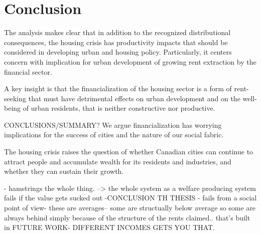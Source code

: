 
\chapter{Conclusion} \label{chapter-conclusions}
The analysis makes clear that in addition to the recognized distributional consequences, the housing crisis has productivity impacts that should be considered in developing urban and housing policy. Particularly, it centers concern with implication for urban development of growing rent extraction by the financial sector. 

A key insight is that the financialization of the housing sector is a form of \gls{rent-seeking} that must have detrimental effects on urban development and on the well-being of urban residents, that is neither constructive nor productive.

CONCLUSIONS/SUMMARY?
We argue financialization %
has worrying implications for the success of cities and the nature of our social fabric. 



The housing crisis raises the question of whether Canadian cities can continue to attract people and accumulate wealth for its residents and industries, and whether they can sustain their growth.





- hamstrings the whole thing.
--> the whole system as a welfare producing system fails if the value gets sucked out -CONCLUSION TH THESIS - fails from a social point of view-
these are averages-- some are structually below average so some are always behind simply because of the structure of the rents claimed.. that's built in FUTURE WORK- DIFFERENT INCOMES GETS YOU THAT. 


